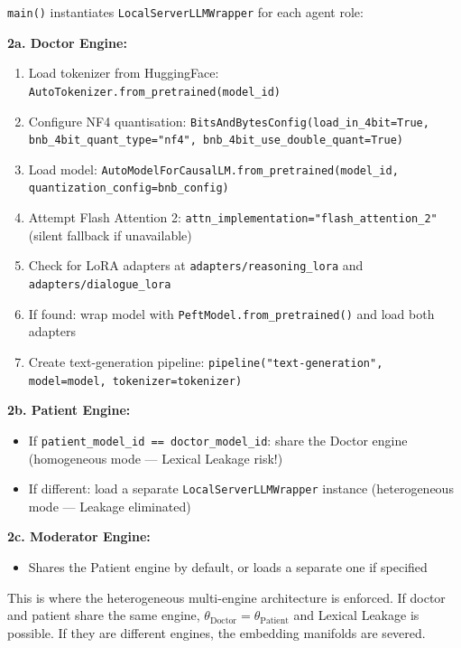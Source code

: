 \begin{acadbox}[\textcolor{white}{What Happens}]
\texttt{main()} instantiates \texttt{LocalServerLLMWrapper} for each agent role:

\textbf{2a. Doctor Engine:}
\begin{enumerate}
    \item Load tokenizer from HuggingFace: \texttt{AutoTokenizer.from\_pretrained(model\_id)}
    \item Configure NF4 quantisation: \texttt{BitsAndBytesConfig(load\_in\_4bit=True, bnb\_4bit\_quant\_type="nf4", bnb\_4bit\_use\_double\_quant=True)}
    \item Load model: \texttt{AutoModelForCausalLM.from\_pretrained(model\_id, quantization\_config=bnb\_config)}
    \item Attempt Flash Attention 2: \texttt{attn\_implementation="flash\_attention\_2"} (silent fallback if unavailable)
    \item Check for LoRA adapters at \texttt{adapters/reasoning\_lora} and \texttt{adapters/dialogue\_lora}
    \item If found: wrap model with \texttt{PeftModel.from\_pretrained()} and load both adapters
    \item Create text-generation pipeline: \texttt{pipeline("text-generation", model=model, tokenizer=tokenizer)}
\end{enumerate}

\textbf{2b. Patient Engine:}
\begin{itemize}
    \item If \texttt{patient\_model\_id == doctor\_model\_id}: share the Doctor engine (homogeneous mode --- Lexical Leakage risk!)
    \item If different: load a separate \texttt{LocalServerLLMWrapper} instance (heterogeneous mode --- Leakage eliminated)
\end{itemize}

\textbf{2c. Moderator Engine:}
\begin{itemize}
    \item Shares the Patient engine by default, or loads a separate one if specified
\end{itemize}
\end{acadbox}

\begin{mattersbox}[\textcolor{white}{Why It Matters}]
This is where the heterogeneous multi-engine architecture is enforced. If doctor and patient share the same engine, $\theta_{\text{Doctor}} = \theta_{\text{Patient}}$ and Lexical Leakage is possible. If they are different engines, the embedding manifolds are severed.
\end{mattersbox}

